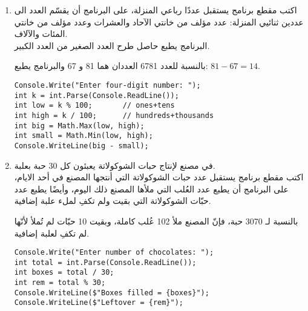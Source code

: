 \documentclass[12pt]{article}
\begin{document}
\begin{enumerate}[itemsep=2em]
    \item
	اكتب مقطع برنامج يستقبل عددًا رباعي المنزلة، على البرنامج أن يقسّم العدد الى عددين ثنائيي المنزلة: عدد مؤلف من خانتي الآحاد والعشرات وعدد مؤلف من خانتي المئات والآلاف. \\
    البرنامج يطبع حاصل طرح العدد الصغير من العدد الكبير. \\
    \begin{boxExample}
        بالنسبة للعدد 6781 العددان هما 81 و 67 والبرنامج يطبع: $81 - 67 = 14$.
    \end{boxExample}

\ifwithsols
\begin{boxSolution}
\begin{english}
\begin{verbatim}
Console.Write("Enter four-digit number: ");
int k = int.Parse(Console.ReadLine());
int low = k % 100;       // ones+tens
int high = k / 100;      // hundreds+thousands
int big = Math.Max(low, high);
int small = Math.Min(low, high);
Console.WriteLine(big - small);
\end{verbatim}
\end{english}
\end{boxSolution}
\fi

\clearpage
    \item
	في مصنع لإنتاج حبات الشوكولاتة يعبئون كل 30 حبة بعلبة. \\
    اكتب مقطع برنامج يستقبل عدد حبات الشوكولاتة التي أنتجها المصنع في أحد الايام، على البرنامج أن يطبع عدد العُلب التي ملأها المصنع ذلك اليوم، وأيضًا يطبع عدد حبّات الشوكولاتة التي بقيت ولم تكفِ لملء علبة إضافية. \\
    \begin{boxExample}
        بالنسبة لـ 3070 حبة، فإنّ المصنع ملأ 102 عُلب كاملة، وبقيت 10 حبّات لم تُملأ لأنّها لم تكفِ لعلبة إضافية.
    \end{boxExample}

\ifwithsols
\begin{boxSolution}
\begin{english}
\begin{verbatim}
Console.Write("Enter number of chocolates: ");
int total = int.Parse(Console.ReadLine());
int boxes = total / 30;
int rem = total % 30;
Console.WriteLine($"Boxes filled = {boxes}");
Console.WriteLine($"Leftover = {rem}");
\end{verbatim}
\end{english}
\end{boxSolution}
\clearpage
\fi


\end{enumerate}
\end{document}
